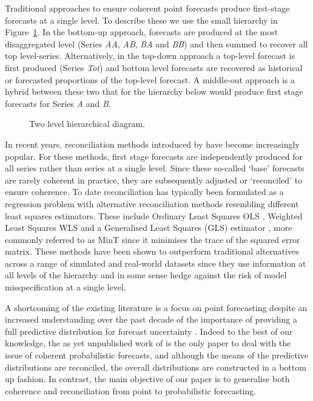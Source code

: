 \documentclass[a4paper, 11pt]{article}
\theoremstyle{theo}
\theoremstyle{definition}
\begin{document}
Traditional approaches to ensure coherent point forecasts produce first-stage forecasts at a single level.  To describe these we use the small hierarchy in Figure~\ref{fig1}. In the bottom-up \citep{Dunn1976} approach, forecasts are produced at the most disaggregated level (Series {\em AA}, {\em AB}, {\em BA} and {\em BB}) and then summed to recover all top level-series.  Alternatively, in the top-down approach \citep{Gross1990} a top-level forecast is first produced (Series {\em Tot}) and bottom level forecasts are recovered as  historical or forecasted proportions of the top-level forecast. A middle-out approach is a hybrid between these two that for the hierarchy below would produce first stage forecasts for Series {\em A} and {\em B}.

\begin{figure}[H]
	\begin{center}
		  
		 
		\qobitree
	\end{center}
	\caption{Two level hierarchical diagram.}\label{fig1}
\end{figure}

In recent years, reconciliation methods introduced by \citet{Hyndman2011} have become increasingly popular.  For these methods, first stage forecasts are independently produced for all series rather than series at a single level.  Since these so-called `base' forecasts are rarely coherent in practice,  they are subsequently adjusted  or `reconciled' to ensure coherence.  To  date reconciliation has typically been formulated as a regression problem with alternative reconciliation methods resembling different least squares estimators. These include Ordinary Least Squares {OLS} \cite{Hyndman2011}, Weighted Least Squares {WLS} \citep{AthEtAl2017} and a Generalised Least Squares (GLS) estimator \citep{Wickramasuriya2017}, more commonly referred to as MinT since it minimises the trace of  the squared error matrix. These methods have been shown to outperform traditional alternatives across a range of simulated and real-world datasets \citep{Hyndman2011,VanErven2015a,Wickramasuriya2017} since they use information at all levels of the hierarchy and in some sense hedge against the risk of model misspecification at a single level.

A shortcoming of the existing literature is a focus on point forecasting despite an increased understanding over the past decade of the importance of providing a full predictive distribution for forecast uncertainty \cite[see][and references therein]{Gneiting2014}.  Indeed to the best of our knowledge, the as yet unpublished work of \cite{BenTaieb2017} is the only paper to deal with the issue of coherent probabilistic forecasts, and although the means of the predictive distributions are reconciled, the overall distributions are constructed in a bottom up fashion.  In contrast, the main objective of our paper is to generalise both coherence and reconciliation from point to probabilistic forecasting.  
\end{document}
